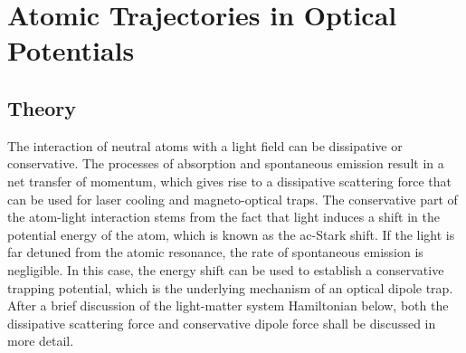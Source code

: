 \documentclass[../Thesis-IJspeert.tex]{subfiles}
\begin{document}
\graphicspath{ {"Atomic Trajectories in Optical Potentials/figs/"} }

\chapter{Atomic Trajectories in Optical Potentials}
\label{chap:AtomicTrajectoriesinOpticalPotentials}

\iffalse
\section{Theory}
The interaction of neutral atoms with a light field can be dissipative or conservative. The processes of absorption and spontaneous emission result in a net transfer of momentum, which gives rise to a dissipative scattering force that can be used for laser cooling and magneto-optical traps. The conservative part of the atom-light interaction stems from the fact that light induces a shift in the potential energy of the atom, which is known as the ac-Stark shift. If the light is far detuned from the atomic resonance, the rate of spontaneous emission is negligible. In this case, the energy shift can be used to establish a conservative trapping potential, which is the underlying mechanism of an optical dipole trap. After a brief discussion of the light-matter system Hamiltonian below, both the dissipative scattering force and conservative dipole force shall be discussed in more detail.
\end{document}
